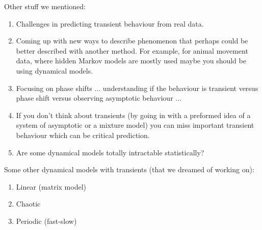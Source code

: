 \documentclass[11pt,letter]{article}
\begin{document}
Other stuff we mentioned:
\begin{enumerate}
\item Challenges in predicting transient behaviour from real data.
\item Coming up with new ways to describe phenomenon that perhaps could be better described with another method. For example, for animal movement data, where hidden Markov models are mostly used maybe you should be using dynamical models.
\item Focusing on phase shifts ... understanding if the behaviour is transient versus phase shift versus observing asymptotic behaviour ... 
\item If you don't think about transients (by going in with a preformed idea of a system of asymptotic or a mixture model) you can miss important transient behaviour which can be critical prediction.
\item Are some dynamical models totally intractable statistically?
\end{enumerate}


Some other dynamical models with transients (that we dreamed of working on):
\begin{enumerate}
\item Linear (matrix model) 
\item Chaotic
\item Periodic (fast-slow)
\end{enumerate}
\end{document}

